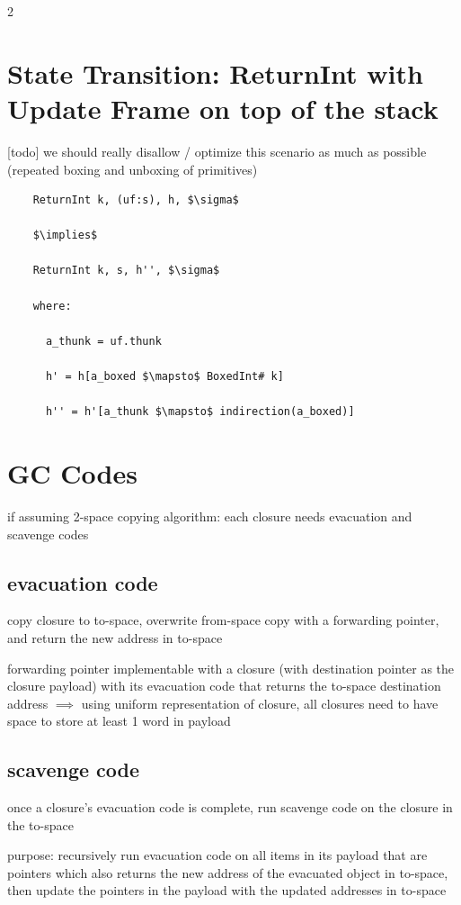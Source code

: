 \documentclass[8pt]{extarticle}
\begin{document}
\begin{multicols*}{2}
  \section{State Transition: ReturnInt with Update Frame on top of the stack}

  [todo] we should really disallow / optimize this scenario as much as possible (repeated boxing and unboxing of primitives)

  \begin{lstlisting}
    ReturnInt k, (uf:s), h, $\sigma$

    $\implies$

    ReturnInt k, s, h'', $\sigma$

    where:

      a_thunk = uf.thunk

      h' = h[a_boxed $\mapsto$ BoxedInt# k]

      h'' = h'[a_thunk $\mapsto$ indirection(a_boxed)]
  \end{lstlisting}

  \vfill\null
  \columnbreak

  \section{GC Codes}

  if assuming 2-space copying algorithm: each closure needs evacuation and scavenge codes

  \subsection{evacuation code}

  copy closure to to-space, overwrite from-space copy with a forwarding pointer, and return the new address in to-space

  forwarding pointer implementable with a closure (with destination pointer as the closure payload) with its evacuation code that returns the to-space destination address $\implies$ using uniform representation of closure, all closures need to have space to store at least 1 word in payload

  \subsection{scavenge code}

  once a closure's evacuation code is complete, run scavenge code on the closure in the to-space

  purpose: recursively run evacuation code on all items in its payload that are pointers which also returns the new address of the evacuated object in to-space, then update the pointers in the payload with the updated addresses in to-space


\end{multicols*}
\end{document}
